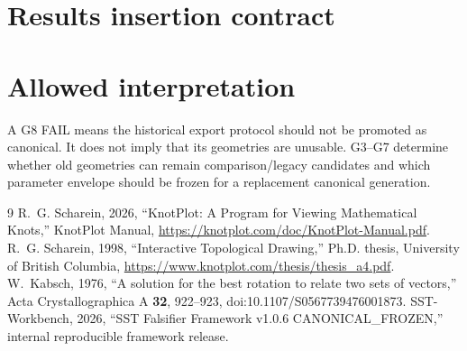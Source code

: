 \documentclass[11pt,a4paper]{article}
\begin{document}
\section{Results insertion contract}
\section{Allowed interpretation}
A G8 FAIL means the historical export protocol should not be promoted as canonical. It does not imply that its geometries are unusable. G3--G7 determine whether old geometries can remain comparison/legacy candidates and which parameter envelope should be frozen for a replacement canonical generation.
\begin{thebibliography}{9}
 R.~G. Scharein, 2026, ``KnotPlot: A Program for Viewing Mathematical Knots,'' KnotPlot Manual, \url{https://knotplot.com/doc/KnotPlot-Manual.pdf}.
 R.~G. Scharein, 1998, ``Interactive Topological Drawing,'' Ph.D. thesis, University of British Columbia, \url{https://www.knotplot.com/thesis/thesis_a4.pdf}.
 W.~Kabsch, 1976, ``A solution for the best rotation to relate two sets of vectors,'' Acta Crystallographica A \textbf{32}, 922--923, doi:10.1107/S0567739476001873.
 SST-Workbench, 2026, ``SST Falsifier Framework v1.0.6 CANONICAL\_FROZEN,'' internal reproducible framework release.
\end{thebibliography}
\end{document}
